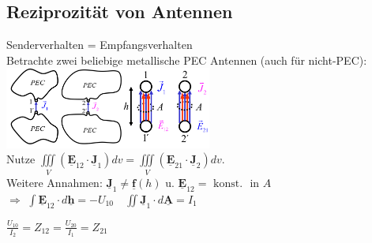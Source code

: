 \documentclass[english]{latex4ei/latex4ei_sheet}
\renewcommand{\vec}[1]{\underline{\boldsymbol{#1}}}
\begin{document}
\begin{sectionbox}
    \subsection{Reziprozität von Antennen}
    Senderverhalten = Empfangsverhalten\\
    Betrachte zwei beliebige metallische PEC Antennen (auch für nicht-PEC):\\
    \includegraphics[width = 6.8cm]{./img/reziproke_antennen.jpeg}\\

    Nutze $\iiint\limits_{V}\left(\vec{E}_{12} \cdot \vec{J}_{1}\right) d v=\iiint\limits_{V}\left(\vec{E}_{21} \cdot \vec{J}_{2}\right) d v$.\\
    Weitere Annahmen: $\vec{J}_{1} \neq \vec{f}(h)$ u. $\vec{E}_{12}=\text { konst. } \text { in } A$\\$\Rightarrow$ $\int \vec{E}_{12} \cdot d \vec{h}=-U_{10} \quad \iint \vec{J}_{1} \cdot d \vec{A}=I_{1}$\\
    \begin{emphbox}
        $\frac{U_{10}}{I_{2}}=Z_{12}=\frac{U_{20}}{I_{1}}=Z_{21}$
    \end{emphbox}
\end{sectionbox}
\end{document}
